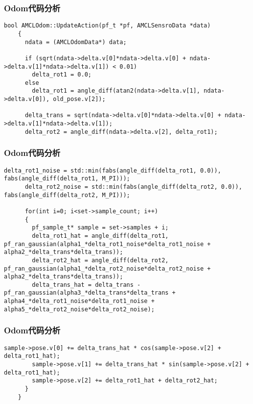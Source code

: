 \begin{frame}[fragile]
  \frametitle{Odom代码分析}



  \begin{lstlisting}[frame=shadowbox]
    bool AMCLOdom::UpdateAction(pf_t *pf, AMCLSensroData *data)
    {
      ndata = (AMCLOdomData*) data;

      if (sqrt(ndata->delta.v[0]*ndata->delta.v[0] + ndata->delta.v[1]*ndata->delta.v[1]) < 0.01) 
        delta_rot1 = 0.0;
      else
        delta_rot1 = angle_diff(atan2(ndata->delta.v[1], ndata->delta.v[0]), old_pose.v[2]);

      delta_trans = sqrt(ndata->delta.v[0]*ndata->delta.v[0] + ndata->delta.v[1]*ndata->delta.v[1]);
      delta_rot2 = angle_diff(ndata->delta.v[2], delta_rot1);
  \end{lstlisting}


\end{frame}


\begin{frame}[fragile]
  \frametitle{Odom代码分析}
  \begin{lstlisting}[frame=shadowbox]
      delta_rot1_noise = std::min(fabs(angle_diff(delta_rot1, 0.0)), fabs(angle_diff(delta_rot1, M_PI)));
      delta_rot2_noise = std::min(fabs(angle_diff(delta_rot2, 0.0)), fabs(angle_diff(delta_rot2, M_PI)));

      for(int i=0; i<set->sample_count; i++)
      {
        pf_sample_t* sample = set->samples + i;
        delta_rot1_hat = angle_diff(delta_rot1, pf_ran_gaussian(alpha1_*delta_rot1_noise*delta_rot1_noise + alpha2_*delta_trans*delta_trans));
        delta_rot2_hat = angle_diff(delta_rot2, pf_ran_gaussian(alpha1_*delta_rot2_noise*delta_rot2_noise + alpha2_*delta_trans*delta_trans));
        delta_trans_hat = delta_trans - pf_ran_gaussian(alpha3_*delta_trans*delta_trans + alpha4_*delta_rot1_noise*delta_rot1_noise + alpha5_*delta_rot2_noise*delta_rot2_noise);
  \end{lstlisting}
\end{frame}

\begin{frame}[fragile]
  \frametitle{Odom代码分析}
  \begin{lstlisting}[frame=shadowbox]
        sample->pose.v[0] += delta_trans_hat * cos(sample->pose.v[2] + delta_rot1_hat);  
        sample->pose.v[1] += delta_trans_hat * sin(sample->pose.v[2] + delta_rot1_hat);  
        sample->pose.v[2] += delta_rot1_hat + delta_rot2_hat;
      }
    }
  \end{lstlisting}
\end{frame}


